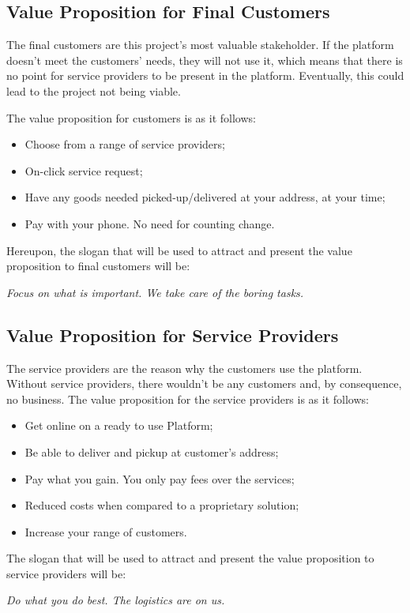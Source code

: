 \subsection{Value Proposition for Final Customers}
The final customers are this project's most valuable stakeholder. If the platform doesn't meet the customers' needs, they will not use it, which means that there is no point for service providers to be present in the platform. Eventually, this could lead to the project not being viable.
\par
The value proposition for customers is as it follows:
\par
\begin{itemize}
    \item Choose from a range of service providers;
    \item On-click service request;
    \item Have any goods needed picked-up/delivered at your address, at your time;
    \item Pay with your phone. No need for counting change.
\end{itemize}
\par
Hereupon, the slogan that will be used to attract and present the value proposition to final customers will be:
\par
\textit{Focus on what is important. We take care of the boring tasks.}

\subsection{Value Proposition for Service Providers}
The service providers are the reason why the customers use the platform. Without service providers, there wouldn't be any customers and, by consequence, no business. The value proposition for the service providers is as it follows:
\par
\begin{itemize}
    \item Get online on a ready to use Platform;
    \item Be able to deliver and pickup at customer's address;
    \item Pay what you gain. You only pay fees over the services;
    \item Reduced costs when compared to a proprietary solution;
    \item Increase your range of customers.
\end{itemize}
\par
The slogan that will be used to attract and present the value proposition to service providers will be:
\par
\textit{Do what you do best. The logistics are on us.}

